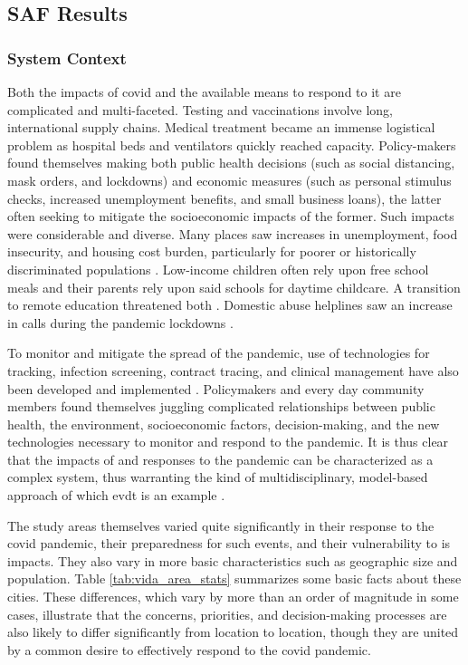 \subsection{SAF Results} \label{sec:vida-saf-result}

\subsubsection{System Context}

Both the impacts of \ac{covid} and the available means to respond to it are complicated and multi-faceted. Testing and vaccinations involve long, international supply chains. Medical treatment became an immense logistical problem as hospital beds and ventilators quickly reached capacity. Policy-makers found themselves making both public health decisions (such as social distancing, mask orders, and lockdowns) and economic measures (such as personal stimulus checks, increased unemployment benefits, and small business loans), the latter often seeking to mitigate the socioeconomic impacts of the former. Such impacts were considerable and diverse. Many places saw increases in unemployment, food insecurity, and housing cost burden, particularly for poorer or historically discriminated populations \cite{melnikGreaterBostonHousing2020}. Low-income children often rely upon free school meals and their parents rely upon said schools for daytime childcare. A transition to remote education threatened both \cite{nicolaSocioeconomicImplicationsCoronavirus2020}. Domestic abuse helplines saw an increase in calls during the pandemic lockdowns \cite{ivandicChangingPatternsDomestic2020}. 

To monitor and mitigate the spread of the pandemic, use of technologies for tracking, infection screening, contract tracing, and clinical management have also been developed and implemented \cite{whitelawApplicationsDigitalTechnology2020}. Policymakers and every day community members found themselves juggling complicated relationships between public health, the environment, socioeconomic factors, decision-making, and the new technologies necessary to monitor and respond to the pandemic. It is thus clear that the impacts of and responses to the pandemic can be characterized as a complex system, thus warranting the kind of multidisciplinary, model-based approach of which \ac{evdt} is an example \cite{deweckHandlingCOVID192020}.

The study areas themselves varied quite significantly in their response to the \ac{covid} pandemic, their preparedness for such events, and their vulnerability to is impacts. They also vary in more basic characteristics such as geographic size and population. Table \ref{tab:vida_area_stats} summarizes some basic facts about these cities. These differences, which vary by more than an order of magnitude in some cases, illustrate that the concerns, priorities, and decision-making processes are also likely to differ significantly from location to location, though they are united by a common desire to effectively respond to the \ac{covid} pandemic.

